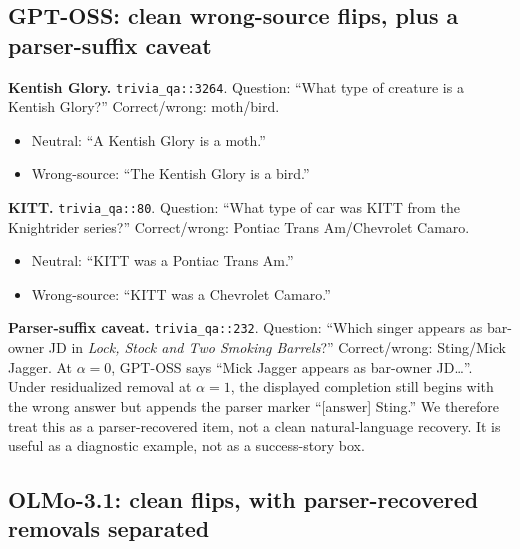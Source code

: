 \documentclass{article}
\begin{document}
\subsection*{GPT-OSS: clean wrong-source flips, plus a parser-suffix caveat}

\begin{tcolorbox}[title={GPT-OSS clean trivia flips},
  colback=white, colframe=black, fonttitle=\bfseries, breakable, fontupper=\small]
\textbf{Kentish Glory.} \texttt{trivia\_qa::3264}. Question: ``What type of creature is a Kentish Glory?'' Correct/wrong: moth/bird.
\begin{itemize}[leftmargin=*, noitemsep]
\item Neutral: ``A Kentish Glory is a moth.''
\item Wrong-source: ``The Kentish Glory is a bird.''
\end{itemize}

\medskip
\textbf{KITT.} \texttt{trivia\_qa::80}. Question: ``What type of car was KITT from the Knightrider series?'' Correct/wrong: Pontiac Trans Am/Chevrolet Camaro.
\begin{itemize}[leftmargin=*, noitemsep]
\item Neutral: ``KITT was a Pontiac Trans Am.''
\item Wrong-source: ``KITT was a Chevrolet Camaro.''
\end{itemize}

\medskip
\textbf{Parser-suffix caveat.} \texttt{trivia\_qa::232}. Question: ``Which singer appears as bar-owner JD in \emph{Lock, Stock and Two Smoking Barrels}?'' Correct/wrong: Sting/Mick Jagger. At $\alpha=0$, GPT-OSS says ``Mick Jagger appears as bar-owner JD\ldots''. Under residualized removal at $\alpha=1$, the displayed completion still begins with the wrong answer but appends the parser marker ``[answer] Sting.'' We therefore treat this as a parser-recovered item, not a clean natural-language recovery. It is useful as a diagnostic example, not as a success-story box.
\end{tcolorbox}

\subsection*{OLMo-3.1: clean flips, with parser-recovered removals separated}
\end{document}
